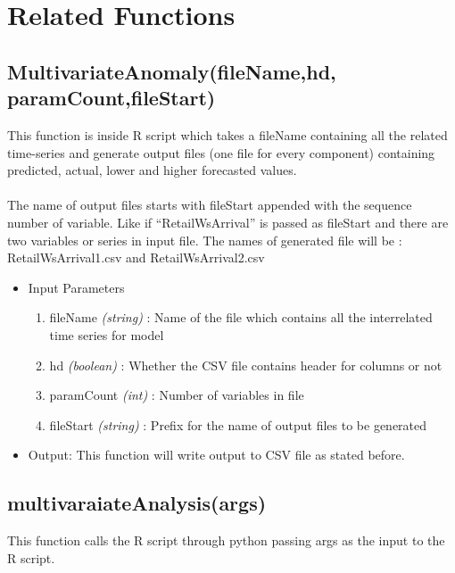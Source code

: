 \section{Related Functions}

\subsection{MultivariateAnomaly(fileName,hd, paramCount,fileStart)}

This function is inside R script which takes a fileName containing all the related 
time-series and generate output files (one file for every component) containing predicted, actual,
lower and higher forecasted values. \\
\\
The name of output files starts with fileStart appended with
the sequence number of variable. Like if ``RetailWsArrival'' is passed as fileStart and there are 
two variables or series in input file. The names of generated file will be : RetailWsArrival1.csv and 
RetailWsArrival2.csv

\begin{itemize}
 \item Input Parameters
 
 \begin{enumerate}
  \item fileName \textit{(string)} : Name of the file which contains all the interrelated time series for model
  \item hd \textit{(boolean)} : Whether the CSV file contains header for columns or not 
  \item paramCount \textit{(int)} : Number of variables in file 
  \item fileStart \textit{(string)} : Prefix for the name of output files to be generated
  
 \end{enumerate}

 \item Output: This function will write output to CSV file as stated before.

\end{itemize}

\subsection{multivaraiateAnalysis(args)}

This function calls the R script through python passing args as the input to the R script.

